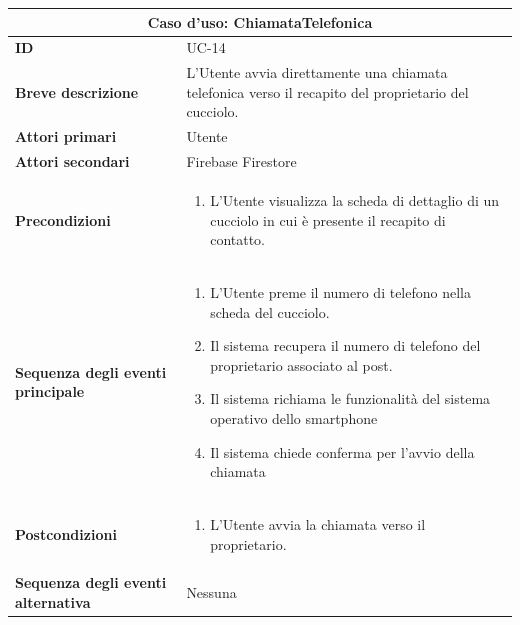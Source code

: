 \documentclass[a4paper]{report}
\begin{document}
\begin{table}[H]
\vspace*{-0cm}
\renewcommand{\arraystretch}{1.9}
\begin{tabular}{|p{3.9cm}|p{9.9cm}|}
\hline
\multicolumn{2}{|c|}{\textbf{Caso d’uso: ChiamataTelefonica}} \\ \hline
\textbf{ID} & UC-14 \\ \hline
\textbf{Breve descrizione} & L'Utente avvia direttamente una chiamata telefonica verso il recapito del proprietario del cucciolo. \\ \hline
\textbf{Attori primari} & Utente \\ \hline
\textbf{Attori secondari} & Firebase Firestore \\ \hline
\textbf{Precondizioni} & \begin{enumerate}[leftmargin=14pt,label=\arabic*.,labelsep=0.5em,topsep=0pt,partopsep=0pt,parsep=0pt,itemsep=0pt]
    \item L'Utente visualizza la scheda di dettaglio di un cucciolo in cui è presente il recapito di contatto.
\end{enumerate} \\ \hline
\textbf{Sequenza degli eventi principale} &
\begin{enumerate}[leftmargin=14pt,label=\arabic*.,labelsep=0.5em,topsep=0pt,partopsep=0pt,parsep=0pt,itemsep=0pt]
   \item L'Utente preme il numero di telefono nella scheda del cucciolo.
   \item Il sistema recupera il numero di telefono del proprietario associato al post.
   \item Il sistema richiama le funzionalità del sistema operativo dello smartphone 
   \item Il sistema chiede conferma per l'avvio della chiamata
\end{enumerate}\\ \hline
\textbf{Postcondizioni} &
\begin{enumerate}[leftmargin=14pt,label=\arabic*.,labelsep=0.5em,topsep=0pt,partopsep=0pt,parsep=0pt,itemsep=0pt]
   \item L'Utente avvia la chiamata verso il proprietario.
\end{enumerate} \\ \hline
\textbf{Sequenza degli eventi alternativa} & Nessuna \\ \hline
\end{tabular}
\end{table}
\end{document}
